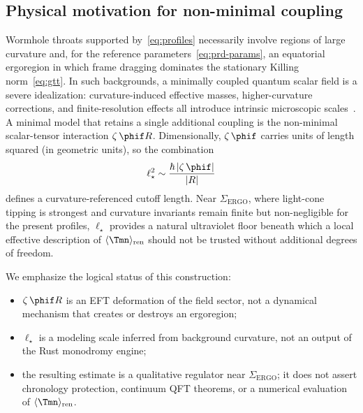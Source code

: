 
\subsection{Physical motivation for non-minimal coupling}

Wormhole throats supported by~\eqref{eq:profiles} necessarily involve regions of large curvature and, for the reference parameters~\eqref{eq:prd-params}, an equatorial ergoregion in which frame dragging dominates the stationary Killing norm~\eqref{eq:gtt}.
In such backgrounds, a minimally coupled quantum scalar field is a severe idealization: curvature-induced effective masses, higher-curvature corrections, and finite-resolution effects all introduce intrinsic microscopic scales~\cite{BirrellDavies1982,Sotiriou2010}.
A minimal model that retains a single additional coupling is the non-minimal scalar-tensor interaction $\zeta\,\phif R$.
Dimensionally, $\zeta\,\phif$ carries units of length squared (in geometric units), so the combination
\begin{equation}
\label{eq:l-star-heuristic}
\ell_{\star}^{2}\sim \frac{\hbar\,|\zeta\,\phif|}{|R|}
\end{equation}
defines a curvature-referenced cutoff length.
Near $\Sigma_{\mathrm{ERGO}}$, where light-cone tipping is strongest and curvature invariants remain finite but non-negligible for the present profiles, $\ell_{\star}$ provides a natural ultraviolet floor beneath which a local effective description of $\langle\Tmn\rangle_{\mathrm{ren}}$ should not be trusted without additional degrees of freedom.

We emphasize the logical status of this construction:
\begin{itemize}
  \item $\zeta\,\phif R$ is an EFT deformation of the field sector, not a dynamical mechanism that creates or destroys an ergoregion;
  \item $\ell_{\star}$ is a modeling scale inferred from background curvature, not an output of the Rust monodromy engine;
  \item the resulting estimate is a qualitative regulator near $\Sigma_{\mathrm{ERGO}}$; it does not assert chronology protection, continuum QFT theorems, or a numerical evaluation of $\langle\Tmn\rangle_{\mathrm{ren}}$.
\end{itemize}

